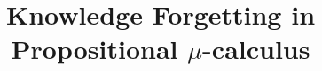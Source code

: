 \documentclass[sn-mathphys]{sn-jnl}%
\theoremstyle{thmstyleone}%
\theoremstyle{thmstyletwo}%
\theoremstyle{thmstylethree}%
\begin{document}
\title[Article Title]{Knowledge Forgetting in Propositional $\mu$-calculus}


\newcommand{\tuple}[1]{{\langle{#1}\rangle}}
\newcommand{\Mod}{\textit{Mod}}
\newcommand\ie{{\it i.e. }}
\newcommand\eg{{\it e.g.}}
\newtheorem{examp}{Example}
\iffalse
\newenvironment{proof}{{\bf Proof:}}{\hfill\rule{2mm}{2mm}\\ }
\fi
\newcommand{\rto}{\rightarrow}
\newcommand{\lto}{\leftarrow}
\newcommand{\lrto}{\leftrightarrow}
\newcommand{\Rto}{\Rightarrow}
\newcommand{\Lto}{\Leftarrow}
\newcommand{\LRto}{\Leftrightarrow}
\newcommand{\Var}{\textit{Var}}
\newcommand{\Forget}{\textit{Forget}}
\newcommand{\KForget}{\textit{KForget}}
\newcommand{\TForget}{\textit{TForget}}
\newcommand{\forget}{\textit{forget}}
\newcommand{\Fst}{\textit{Fst}}
\newcommand{\dep}{\textit{dep}}
\newcommand{\term}{\textit{term}}
\newcommand{\literal}{\textit{literal}}

\newcommand{\Atom}{\mathcal{A}}
\newcommand{\SFive}{\textbf{S5}}
\newcommand{\MPK}{\textsc{k}}
\newcommand{\MPB}{\textsc{b}}
\newcommand{\MPT}{\textsc{t}}
\newcommand{\MPA}{\forall}
\newcommand{\MPE}{\exists}

\newcommand{\DNF}{\textit{DNF}}
\newcommand{\CNF}{\textit{CNF}}

\newcommand{\degree}{\textit{degree}}
\newcommand{\sunfold}{\textit{sunfold}}

\newcommand{\Pos}{\textit{Pos}}
\newcommand{\Neg}{\textit{Neg}}
\newcommand\wrt{{\it w.r.t.}}
\newcommand{\Hm} {{\cal M}}
\newcommand{\Hw} {{\cal W}}
\newcommand{\Hr} {{\cal R}}
\newcommand{\Hb} {{\cal B}}
\newcommand{\Ha} {{\cal A}}

\newcommand{\Dsj}{\triangledown}

\newcommand{\wnext}{\widetilde{\bigcirc}}
\newcommand{\nex}{\bigcirc}
\newcommand{\ness}{\square}
\newcommand{\qness}{\boxminus}
\newcommand{\wqnext}{\widetilde{\circleddash}}
\newcommand{\qnext}{\circleddash}
\newcommand{\may}{\lozenge}
\newcommand{\qmay}{\blacklozenge}
\newcommand{\unt} {{\cal U}}
\newcommand{\since} {{\cal S}}
\newcommand{\SNF} {\textit{SNF$_C$}}
\newcommand{\start}{\textbf{start}}
\newcommand{\Elm}{\textit{Elm}}
\newcommand{\simp}{\textbf{simp}}
\newcommand{\nnf}{\textbf{nnf}}
\end{document}
